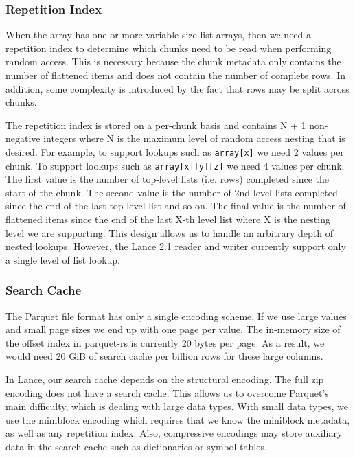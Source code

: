 \documentclass[sigconf, nonacm]{acmart}
\begin{document}
\subsubsection{Repetition Index}

When the array has one or more variable-size list arrays, then we need a repetition index to determine which chunks need to be read when performing random access.  This is necessary because the chunk metadata only contains the number of flattened items and does not contain the number of complete rows.  In addition, some complexity is introduced by the fact that rows may be split across chunks.

The repetition index is stored on a per-chunk basis and contains N + 1 non-negative integers where N is the maximum level of random access nesting that is desired.  For example, to support lookups such as \texttt{array[x]} we need 2 values per chunk.  To support lookups such as \texttt{array[x][y][z]} we need 4 values per chunk.  The first value is the number of top-level lists (i.e. rows) completed since the start of the chunk.  The second value is the number of 2nd level lists completed since the end of the last top-level list and so on.  The final value is the number of flattened items since the end of the last X-th level list where X is the nesting level we are supporting.  This design allows us to handle an arbitrary depth of nested lookups.  However, the Lance 2.1 reader and writer currently support only a single level of list lookup.

\subsubsection{Search Cache} \label{search-cache}

The Parquet file format has only a single encoding scheme.  If we use large values and small page sizes we end up with one page per value.  The in-memory size of the offset index in parquet-rs is currently 20 bytes per page.  As a result, we would need 20 GiB of search cache per billion rows for these large columns.

In Lance, our search cache depends on the structural encoding.  The full zip encoding does not have a search cache.  This allows us to overcome Parquet's main difficulty, which is dealing with large data types.  With small data types, we use the miniblock encoding which requires that we know the miniblock metadata, as well as any repetition index. Also, compressive encodings may store auxiliary data in the search cache such as dictionaries or symbol tables.
\end{document}
